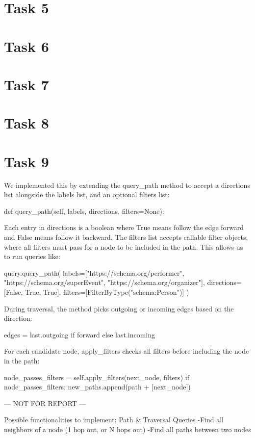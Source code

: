 \documentclass[a4paper,11pt]{article}
\begin{document}
\section{Task 5}

\section{Task 6}

\section{Task 7}

\section{Task 8}

\section{Task 9}
We implemented this by extending the query_path method to accept a directions list alongside the labels list, and an optional filters list:

def query_path(self, labels, directions, filters=None):

Each entry in directions is a boolean where True means follow the edge forward and False means follow it backward. The filters list accepts callable filter objects, where all filters must pass for a node to be included in the path. This allows us to run queries like:

query.query_path(
    labels=["https://schema.org/performer", 
            "https://schema.org/superEvent", 
            "https://schema.org/organizer"],
    directions=[False, True, True],
    filters=[FilterByType("schema:Person")]
)

During traversal, the method picks outgoing or incoming edges based on the direction:

edges = last.outgoing if forward else last.incoming

For each candidate node, apply_filters checks all filters before including the node in the path:

node_passes_filters = self.apply_filters(next_node, filters)
if node_passes_filters:
    new_paths.append(path + [next_node])



--- NOT FOR REPORT ---

Possible functionalities to implement:
    Path & Traversal Queries
    -Find all neighbors of a node (1 hop out, or N hops out)
    -Find all paths between two nodes
\end{document}
